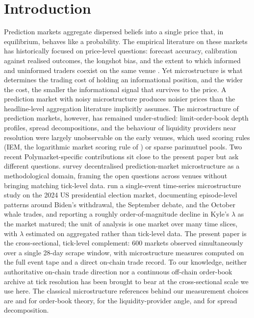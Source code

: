 \section{Introduction}\label{sec:intro}

Prediction markets aggregate dispersed beliefs into a single price
that, in equilibrium, behaves like a probability. The empirical
literature on these markets has historically focused on price-level
questions: forecast accuracy, calibration against realised outcomes,
the longshot bias, and the extent to which informed and uninformed
traders coexist on the same venue
\citep{wolfers-zitzewitz-2004,manski-2006,page-clemen-2013}.
Yet microstructure is what determines the trading cost of holding an
informational position, and the wider the cost, the smaller the
informational signal that survives to the price. A prediction market
with noisy microstructure produces noisier prices than the
headline-level aggregation literature implicitly assumes.
The microstructure of prediction markets, however, has remained
under-studied: limit-order-book depth profiles, spread decompositions,
and the behaviour of liquidity providers near resolution were largely
unobservable on the early venues, which used scoring rules
(IEM, the logarithmic market scoring rule of \citealt{hanson-2007})
or sparse parimutuel pools. Two recent
Polymarket-specific contributions sit close to the present paper but
ask different questions. \citet{rahman-alchami-clark-2025} survey
decentralised prediction-market microstructure as a methodological
domain, framing the open questions across venues without bringing
matching tick-level data. \citet{tsang-yang-2026} run a single-event
time-series microstructure study on the 2024 US presidential
election market, documenting episode-level patterns around Biden's
withdrawal, the September debate, and the October whale trades, and
reporting a roughly order-of-magnitude decline in Kyle's $\lambda$
as the market matured; the unit of analysis is one market over many
time slices, with $\lambda$ estimated on aggregated rather than
tick-level data. The present paper is the cross-sectional, tick-level
complement: 600 markets observed simultaneously over a single 28-day
scrape window, with microstructure measures computed on the full
event tape and a direct on-chain trade record. To our knowledge,
neither authoritative on-chain trade direction nor a continuous
off-chain order-book archive at tick resolution has been brought to
bear at the cross-sectional scale we use here.
The classical microstructure references behind our measurement
choices are \citet{ohara-1995} and \citet{hasbrouck-2007} for
order-book theory, \citet{foucault-pagano-roell-2013} for the
liquidity-provider angle, and
\citet{huang-stoll-1997,madhavan-richardson-roomans-1997} for spread
decomposition.


